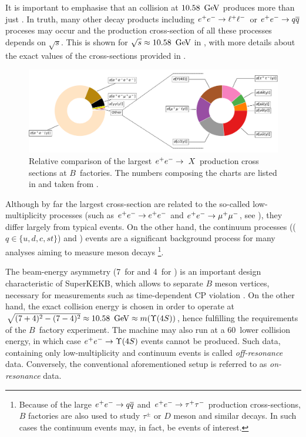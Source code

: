 It is important to emphasise that an \epem collision at $10.58~\mathrm{\,Ge\kern -0.1em V}$ produces more than just \FourS.
In truth, many other decay products including $e^+e^-\rightarrow\ell^+\ell^-$ or $e^+e^-\rightarrow q\overline q$ proceses may occur and the production 
cross-section  of all these processes depends on $\sqrt{s}$.
This is shown for $\sqrt{s}\approx10.58~\mathrm{\,Ge\kern -0.1em V}$ in , with more details about the exact values of the cross-sections provided in .
\begin{figure}[htbp!]
    \includegraphics[width=1\textwidth]{figures/experimental_setup/corss_sections.pdf}
    \caption{\label{fig:cross_sections} Relative comparison of the largest $e^+e^-\rightarrow\ X$ production cross sections at $B$~factories.
    The numbers composing the charts are listed in  and taken from \cite{Belle-II:2018jsg}.
    }
\end{figure}

Although by far the largest cross-section are related to the so-called low-multiplicity processes 
(such as $e^+e^-\rightarrow e^+e^-$ and $e^+e^-\rightarrow\mu^+\mu^-$, see ),
they differ largely from typical \FourS\ra\BB events.
On the other hand, the continuum processes (\epem\ra\qqbar ($q\in\{u,d,c,st\}$) and \epem\ra\tautau) 
events are a significant background process for many analyses aiming to measure \B meson decays
\footnote[1]{Because of the large $e^+e^-\rightarrow q\overline q$ and $e^+e^-\rightarrow\tau^+\tau^-$ production cross-sections, 
$B$ factories are also used to study $\tau^{\pm}$ or $D$ meson and similar decays.
In such cases the continuum events may, in fact, be events of interest.}.

The beam-energy asymmetry (7~\gev for \en and 4~\gev for \ep) is an important design characteristic of SuperKEKB, 
which allows to separate $B$ meson vertices, necessary for measurements such as time-dependent CP violation \cite{BaBar:2014omp}.
On the other hand, the exact collision energy is chosen in order to operate at $\sqrt{(7+4)^2-(7-4)^2}\approx10.58~\gev\approx m(\FourS)$, 
hence fulfilling the requirements of the $B$~factory experiment.
The machine may also run at a 60~\mev lower collision energy, in which case $\epem\ra\FourS$ events cannot be produced.
Such data, containing only low-multiplicity and continuum events is called \textit{off-resonance} data.
Conversely, the conventional aforementioned setup is referred to as \textit{on-resonance} data.

